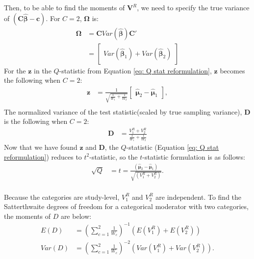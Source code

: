 Then, to be able to find the moments of $\mathbf{V}^R$, we need to specify the true variance of $(\mathbf{C}\bm{\hat{\beta}}-\mathbf{c})$. For $C = 2$,  $\mathbf{\Omega}$ is:
 \begin{equation}
     \begin{split}
         \mathbf{\Omega}  &= \mathbf{C}Var(\bm{\hat{\beta}}) \mathbf{C}' \\
    &= \begin{bmatrix}
        Var(\bm{\hat{\beta}}_1) + Var(\bm{\hat{\beta}}_2) 
    \end{bmatrix} 
     \end{split}
     \nonumber
 \end{equation}
For the $\mathbf{z}$ in the $Q$-statistic from Equation \ref{eq: Q stat reformulation}, $\mathbf{z}$ becomes the following when $C=2$: 
 \begin{equation}
    \begin{split}
     \mathbf{z} &= \frac{1}{\sqrt{\frac{1}{W_1} + \frac{1}{W_2}}} \begin{bmatrix}
         \bm{\hat{\mu}}_2 - \bm{\hat{\mu}}_1 
     \end{bmatrix},   \\
    \end{split}
     \nonumber
 \end{equation}
 The normalized variance of the test statistic(scaled by true sampling variance), $\mathbf{D}$ is the following when $C=2$:
 \begin{equation}
    \begin{split}
    \mathbf{D}  & = \frac{V^R_1 + V^R_2 }{\frac{1}{W_1} + \frac{1}{W_2} }
    \end{split} 
    \nonumber
 \end{equation}
Now that we have found $\mathbf{z}$ and $\mathbf{D}$,  the $Q$-statistic (Equation \ref{eq: Q stat reformulation}) reduces to $t^2$-statistic, so the $t$-statistic formulation is as follows:
\begin{equation}
    \begin{split}
         \sqrt{Q} &= t = \frac{\left(\mathbf{\hat{\mu}}_2 - \mathbf{\hat{\mu}}_1  \right)}{\sqrt{\left(V^R_1 + V^R_2 \right)} }. \\
    \end{split}
    \nonumber
\end{equation}

Because the categories are study-level, $V_1^R$ and $V_2^R$ are independent. To find the Satterthwaite degrees of freedom for a categorical moderator with two categories, the moments of $D$ are below:
\begin{equation}
    \begin{split}
        E(D) & = \left(\sum_{c=1}^2 \frac{1}{W_c}  \right)^{-1} \left(E(V^R_1) + E(V^R_2)  \right) \\
         Var(D) & = \left(\sum_{c=1}^2 \frac{1}{W_c}  \right)^{-2 } \left(Var(V^R_1) + Var(V^R_2)  \right). \\
    \end{split}
    \nonumber
\end{equation}

